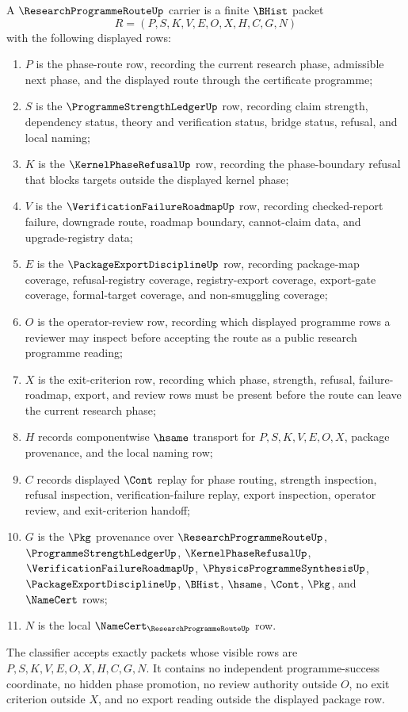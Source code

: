 \begin{definition}
\label{def:research-programme-route-carrier}
A $\ResearchProgrammeRouteUp$ carrier is a finite $\BHist$ packet
$$
R=(P,S,K,V,E,O,X,H,C,G,N)
$$
with the following displayed rows:
\begin{enumerate}
\item $P$ is the phase-route row, recording the current research phase, admissible next phase, and the displayed route through the certificate programme;
\item $S$ is the $\ProgrammeStrengthLedgerUp$ row, recording claim strength, dependency status, theory and verification status, bridge status, refusal, and local naming;
\item $K$ is the $\KernelPhaseRefusalUp$ row, recording the phase-boundary refusal that blocks targets outside the displayed kernel phase;
\item $V$ is the $\VerificationFailureRoadmapUp$ row, recording checked-report failure, downgrade route, roadmap boundary, cannot-claim data, and upgrade-registry data;
\item $E$ is the $\PackageExportDisciplineUp$ row, recording package-map coverage, refusal-registry coverage, registry-export coverage, export-gate coverage, formal-target coverage, and non-smuggling coverage;
\item $O$ is the operator-review row, recording which displayed programme rows a reviewer may inspect before accepting the route as a public research programme reading;
\item $X$ is the exit-criterion row, recording which phase, strength, refusal, failure-roadmap, export, and review rows must be present before the route can leave the current research phase;
\item $H$ records componentwise $\hsame$ transport for $P,S,K,V,E,O,X$, package provenance, and the local naming row;
\item $C$ records displayed $\Cont$ replay for phase routing, strength inspection, refusal inspection, verification-failure replay, export inspection, operator review, and exit-criterion handoff;
\item $G$ is the $\Pkg$ provenance over $\ResearchProgrammeRouteUp$, $\ProgrammeStrengthLedgerUp$, $\KernelPhaseRefusalUp$, $\VerificationFailureRoadmapUp$, $\PhysicsProgrammeSynthesisUp$, $\PackageExportDisciplineUp$, $\BHist$, $\hsame$, $\Cont$, $\Pkg$, and $\NameCert$ rows;
\item $N$ is the local $\NameCert_{\ResearchProgrammeRouteUp}$ row.
\end{enumerate}
The classifier accepts exactly packets whose visible rows are $P,S,K,V,E,O,X,H,C,G,N$. It contains no independent programme-success coordinate, no hidden phase promotion, no review authority outside $O$, no exit criterion outside $X$, and no export reading outside the displayed package row.
\end{definition}

